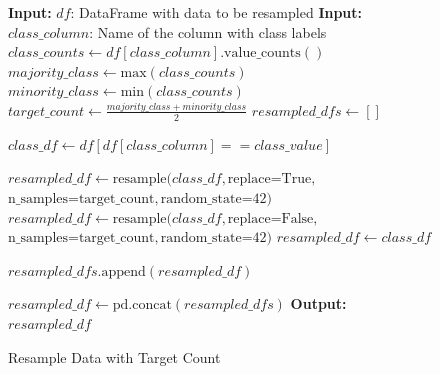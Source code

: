 \documentclass[runningheads]{llncs}
\begin{document}
\begin{figure}[!t]
    \centering
    \begin{minipage}{0.85\textwidth}  %
        \scriptsize  %
        \begin{algorithm}[H]
            \caption{Resample Data with Target Count}
            \label{resampling_algo}

            \begin{algorithmic}[1]
            \State \textbf{Input:} $df$: DataFrame with data to be resampled
            \State \textbf{Input:} $class\_column$: Name of the column with class labels
            \State $class\_counts \gets df[class\_column].\text{value\_counts}()$
            \State $majority\_class \gets \text{max}(class\_counts)$
            \State $minority\_class \gets \text{min}(class\_counts)$
            \State $target\_count \gets \frac{majority\_class + minority\_class}{2}$ 
            \State $resampled\_dfs \gets []$  
            
                \State $class\_df \gets df[df[class\_column] == class\_value]$
                
                    \State $resampled\_df \gets \text{resample}(class\_df, \text{replace=True},$
                    \Statex \hspace{10em} $\text{n\_samples=target\_count}, \text{random\_state=42})$
                    \State $resampled\_df \gets \text{resample}(class\_df, \text{replace=False},$
                    \Statex \hspace{10em} $\text{n\_samples=target\_count}, \text{random\_state=42})$
                \Else
                    \State $resampled\_df \gets class\_df$
                \EndIf
                
                \State $resampled\_dfs.\text{append}(resampled\_df)$
            \EndFor
            
            \State $resampled\_df \gets \text{pd.concat}(resampled\_dfs)$
            \State \textbf{Output:} $resampled\_df$
            \end{algorithmic}
        \end{algorithm}
    \end{minipage}
\end{figure}
\end{document}
